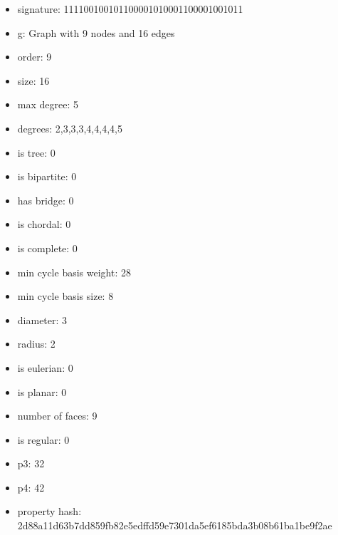 \newpage
\begin{figure}
\end{figure}
\begin{itemize}
\item signature: 111100100101100001010001100001001011
\item g: Graph with 9 nodes and 16 edges
\item order: 9
\item size: 16
\item max degree: 5
\item degrees: 2,3,3,3,4,4,4,4,5
\item is tree: 0
\item is bipartite: 0
\item has bridge: 0
\item is chordal: 0
\item is complete: 0
\item min cycle basis weight: 28
\item min cycle basis size: 8
\item diameter: 3
\item radius: 2
\item is eulerian: 0
\item is planar: 0
\item number of faces: 9
\item is regular: 0
\item p3: 32
\item p4: 42
\item property hash: 2d88a11d63b7dd859fb82e5edffd59e7301da5ef6185bda3b08b61ba1be9f2ae
\end{itemize}
